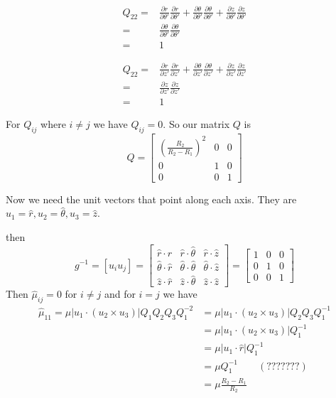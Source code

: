 \documentclass{amsart}
\begin{document}
\begin{align*}
Q_{22}
=&\frac{\partial r}{\partial \theta'}\frac{\partial r}{\partial \theta'}
+\frac{\partial \theta}{\partial \theta'}\frac{\partial \theta}{\partial \theta'}
+\frac{\partial z}{\partial \theta'}\frac{\partial z}{\partial \theta'}\\
=&\frac{\partial \theta}{\partial \theta'}\frac{\partial \theta}{\partial \theta'}\\
=&1
\end{align*}

\begin{align*}
Q_{22}
=&\frac{\partial r}{\partial z'}\frac{\partial r}{\partial z'}
+\frac{\partial \theta}{\partial z'}\frac{\partial \theta}{\partial z'}
+\frac{\partial z}{\partial z'}\frac{\partial z}{\partial z'}\\
=&\frac{\partial z}{\partial z'}\frac{\partial z}{\partial z'}\\
=&1
\end{align*}

For $Q_{ij}$ where $i\neq j$ we have $Q_{ij}=0$. So our matrix $Q$ is
\[
  Q=\begin{bmatrix}
    \left(\frac{R_2}{R_2-R_1}\right)^2 & 0 & 0\\
    0 & 1 & 0\\
    0 & 0 & 1
  \end{bmatrix}
\]

Now we need the unit vectors that point along each axis. They are $u_1=\hat{r},u_2=\hat{\theta},u_3=\hat{z}$.

then
\[
  g^{-1}=
  [u_iu_j]=
  \begin{bmatrix}
    \hat{r}\cdot\hat{r} & \hat{r}\cdot\hat{\theta} & \hat{r}\cdot\hat{z}\\
    \hat{\theta}\cdot\hat{r} & \hat{\theta}\cdot\hat{\theta} & \hat{\theta}\cdot\hat{z}\\
    \hat{z}\cdot\hat{r} & \hat{z}\cdot\hat{\theta} & \hat{z}\cdot\hat{z}
  \end{bmatrix}
  =
  \begin{bmatrix}
    1 & 0 & 0\\
    0 & 1 & 0\\
    0 & 0 & 1
  \end{bmatrix}
\]
Then $\hat{\mu}_{ij}=0$ for $i\neq j$ and for $i=j$ we have
\begin{align*}
  \hat{\mu}_{11}=\mu|u_1\cdot(u_2\times u_3)|Q_1Q_2Q_3Q_1^{-2}
  &=\mu|u_1\cdot(u_2\times u_3)|Q_2Q_3Q_1^{-1}\\
  &=\mu|u_1\cdot(u_2\times u_3)|Q_1^{-1}\\
  &=\mu|u_1\cdot\hat{r}|Q_1^{-1}\\
  &=\mu Q_1^{-1}\qquad (???????)\\
  &=\mu \frac{R_2-R_1}{R_2}
\end{align*}
\end{document}
